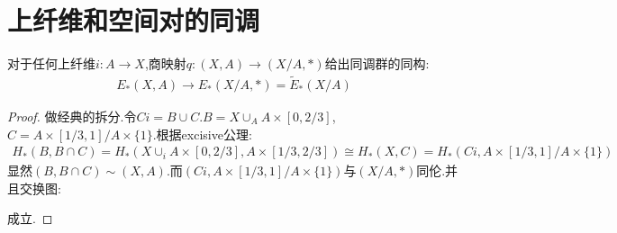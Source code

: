 \section{上纤维和空间对的同调}
\begin{theorem}
    对于任何上纤维$i:A \to X$,商映射$q:(X,A) \to (X/A,*)$给出同调群的同构:
    \begin{align*}
        E_*(X,A) \to E_*(X/A,*)=\tilde{E}_*(X/A)
    \end{align*}
\end{theorem}
\begin{proof}
    做经典的拆分.令$Ci=B\cup C$.$B=X\cup_A A\times [0,2/3]$,$C=A\times [1/3,1]/A \times \{1\}$.根据excisive公理:
    \begin{align*}
        H_*(B,B\cap C)=H_*(X\cup_i A\times [0,2/3],A\times [1/3,2/3]) \cong H_*(X,C)=H_*(Ci,A\times [1/3,1]/A \times \{1\})
    \end{align*}
    显然$(B,B\cap C)\sim (X,A)$.而$(Ci,A \times [1/3,1]/A\times\{1\})$与$(X/A,*)$同伦.并且交换图:
    
    成立.
\end{proof}

